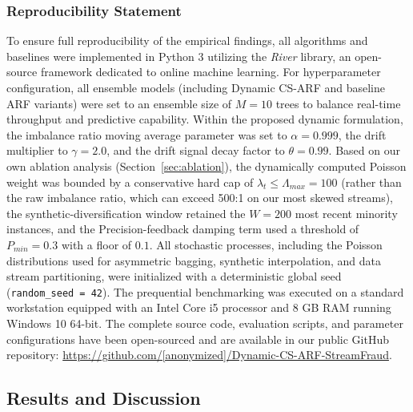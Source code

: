 \documentclass[review,12pt]{elsarticle}
\begin{document}
\subsubsection{Reproducibility Statement}
To ensure full reproducibility of the empirical findings, all algorithms and baselines were implemented in Python 3 utilizing the \textit{River} library, an open-source framework dedicated to online machine learning. For hyperparameter configuration, all ensemble models (including Dynamic CS-ARF and baseline ARF variants) were set to an ensemble size of $M=10$ trees to balance real-time throughput and predictive capability. Within the proposed dynamic formulation, the imbalance ratio moving average parameter was set to $\alpha=0.999$, the drift multiplier to $\gamma=2.0$, and the drift signal decay factor to $\theta=0.99$. Based on our own ablation analysis (Section~\ref{sec:ablation}), the dynamically computed Poisson weight was bounded by a conservative hard cap of $\lambda_t \le \Lambda_{max}=100$ (rather than the raw imbalance ratio, which can exceed 500:1 on our most skewed streams), the synthetic-diversification window retained the $W=200$ most recent minority instances, and the Precision-feedback damping term used a threshold of $P_{min}=0.3$ with a floor of $0.1$. All stochastic processes, including the Poisson distributions used for asymmetric bagging, synthetic interpolation, and data stream partitioning, were initialized with a deterministic global seed (\texttt{random\_seed = 42}). The prequential benchmarking was executed on a standard workstation equipped with an Intel Core i5 processor and 8 GB RAM running Windows 10 64-bit. The complete source code, evaluation scripts, and parameter configurations have been open-sourced and are available in our public GitHub repository: \url{https://github.com/[anonymized]/Dynamic-CS-ARF-StreamFraud}.

\subsection{Results and Discussion}
\end{document}

